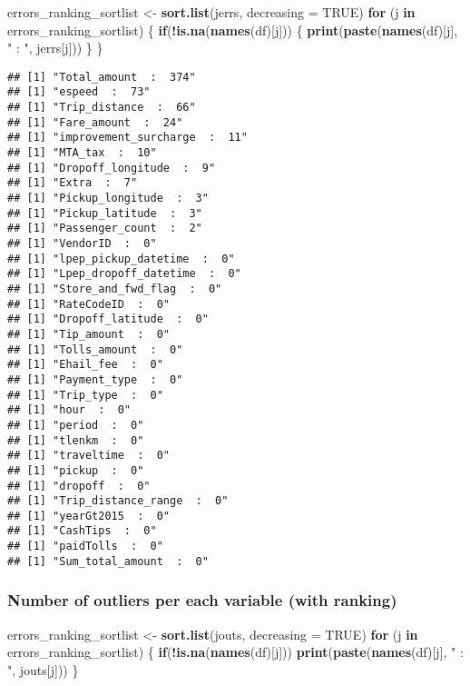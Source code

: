 \documentclass[
  18pt,
  a4paper]{article}
\newenvironment{Shaded}{\begin{snugshade}}{\end{snugshade}}
\newcommand{\ControlFlowTok}[1]{\textcolor[rgb]{0.13,0.29,0.53}{\textbf{#1}}}
\newcommand{\DataTypeTok}[1]{\textcolor[rgb]{0.13,0.29,0.53}{#1}}
\newcommand{\KeywordTok}[1]{\textcolor[rgb]{0.13,0.29,0.53}{\textbf{#1}}}
\newcommand{\NormalTok}[1]{#1}
\newcommand{\OperatorTok}[1]{\textcolor[rgb]{0.81,0.36,0.00}{\textbf{#1}}}
\newcommand{\OtherTok}[1]{\textcolor[rgb]{0.56,0.35,0.01}{#1}}
\newcommand{\StringTok}[1]{\textcolor[rgb]{0.31,0.60,0.02}{#1}}
\begin{document}
\begin{Shaded}
\begin{Highlighting}[]
\NormalTok{errors_ranking_sortlist <-}\StringTok{ }\KeywordTok{sort.list}\NormalTok{(jerrs, }\DataTypeTok{decreasing =} \OtherTok{TRUE}\NormalTok{)}
\ControlFlowTok{for}\NormalTok{ (j }\ControlFlowTok{in}\NormalTok{ errors_ranking_sortlist) \{}
  \ControlFlowTok{if}\NormalTok{(}\OperatorTok{!}\KeywordTok{is.na}\NormalTok{(}\KeywordTok{names}\NormalTok{(df)[j])) \{ }\KeywordTok{print}\NormalTok{(}\KeywordTok{paste}\NormalTok{(}\KeywordTok{names}\NormalTok{(df)[j], }\StringTok{" : "}\NormalTok{, jerrs[j])) \}}
\NormalTok{\}}
\end{Highlighting}
\end{Shaded}

\begin{verbatim}
## [1] "Total_amount  :  374"
## [1] "espeed  :  73"
## [1] "Trip_distance  :  66"
## [1] "Fare_amount  :  24"
## [1] "improvement_surcharge  :  11"
## [1] "MTA_tax  :  10"
## [1] "Dropoff_longitude  :  9"
## [1] "Extra  :  7"
## [1] "Pickup_longitude  :  3"
## [1] "Pickup_latitude  :  3"
## [1] "Passenger_count  :  2"
## [1] "VendorID  :  0"
## [1] "lpep_pickup_datetime  :  0"
## [1] "Lpep_dropoff_datetime  :  0"
## [1] "Store_and_fwd_flag  :  0"
## [1] "RateCodeID  :  0"
## [1] "Dropoff_latitude  :  0"
## [1] "Tip_amount  :  0"
## [1] "Tolls_amount  :  0"
## [1] "Ehail_fee  :  0"
## [1] "Payment_type  :  0"
## [1] "Trip_type  :  0"
## [1] "hour  :  0"
## [1] "period  :  0"
## [1] "tlenkm  :  0"
## [1] "traveltime  :  0"
## [1] "pickup  :  0"
## [1] "dropoff  :  0"
## [1] "Trip_distance_range  :  0"
## [1] "yearGt2015  :  0"
## [1] "CashTips  :  0"
## [1] "paidTolls  :  0"
## [1] "Sum_total_amount  :  0"
\end{verbatim}

\hypertarget{number-of-outliers-per-each-variable-with-ranking}{%
\subsubsection{Number of outliers per each variable (with
ranking)}\label{number-of-outliers-per-each-variable-with-ranking}}

\begin{Shaded}
\begin{Highlighting}[]
\NormalTok{errors_ranking_sortlist <-}\StringTok{ }\KeywordTok{sort.list}\NormalTok{(jouts, }\DataTypeTok{decreasing =} \OtherTok{TRUE}\NormalTok{)}
\ControlFlowTok{for}\NormalTok{ (j }\ControlFlowTok{in}\NormalTok{ errors_ranking_sortlist) \{}
  \ControlFlowTok{if}\NormalTok{(}\OperatorTok{!}\KeywordTok{is.na}\NormalTok{(}\KeywordTok{names}\NormalTok{(df)[j])) }\KeywordTok{print}\NormalTok{(}\KeywordTok{paste}\NormalTok{(}\KeywordTok{names}\NormalTok{(df)[j], }\StringTok{" : "}\NormalTok{, jouts[j]))}
\NormalTok{\}}
\end{Highlighting}
\end{Shaded}
\end{document}
